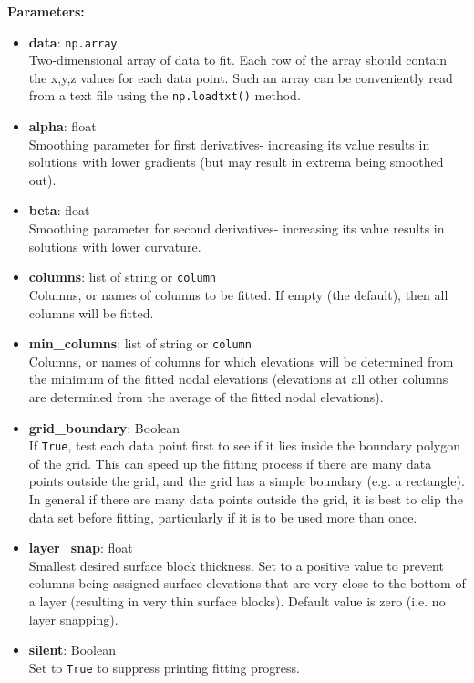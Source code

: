 \textbf{Parameters:}
\begin{itemize}
\item \textbf{data}: \texttt{np.array}\\
  Two-dimensional array of data to fit.  Each row of the array should contain the x,y,z values for each data point.  Such an array can be conveniently read from a text file using the \texttt{np.loadtxt()} method.
\item \textbf{alpha}: float\\
  Smoothing parameter for first derivatives- increasing its value results in solutions with lower gradients (but may result in extrema being smoothed out).
\item \textbf{beta}: float\\
  Smoothing parameter for second derivatives- increasing its value results in solutions with lower curvature.
\item \textbf{columns}: list of string or \texttt{column}\\
  Columns, or names of columns to be fitted.  If empty (the default), then all columns will be fitted.
\item \textbf{min\_columns}: list of string or \texttt{column}\\
  Columns, or names of columns for which elevations will be determined from the minimum of the fitted nodal elevations (elevations at all other columns are determined from the average of the fitted nodal elevations).
\item \textbf{grid\_boundary}: Boolean\\
  If \texttt{True}, test each data point first to see if it lies inside the boundary polygon of the grid.  This can speed up the fitting process if there are many data points outside the grid, and the grid has a simple boundary (e.g. a rectangle).  In general if there are many data points outside the grid, it is best to clip the data set before fitting, particularly if it is to be used more than once.
\item \textbf{layer\_snap}: float\\
  Smallest desired surface block thickness.  Set to a positive value to prevent columns being assigned surface elevations that are very close to the bottom of a layer (resulting in very thin surface blocks).  Default value is zero (i.e. no layer snapping).
\item \textbf{silent}: Boolean\\
  Set to \texttt{True} to suppress printing fitting progress.
\end{itemize}

